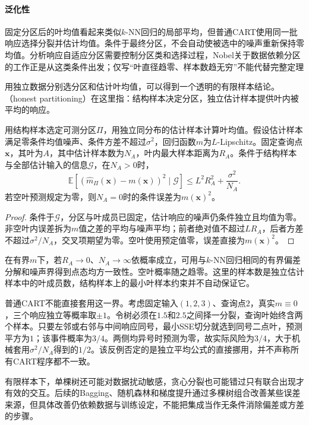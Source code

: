 \paragraph{泛化性}
固定分区后的叶均值看起来类似$k$-NN回归的局部平均，但普通CART使用同一批响应选择分裂并估计均值。条件于最终分区，不会自动使被选中的噪声重新保持零均值。分析响应自适应分区需要控制分区类和选择过程，Nobel关于数据依赖分区的工作正是从这类条件出发；仅写“叶直径趋零、样本数趋无穷”不能代替完整定理

用独立数据分别选分区和估计叶均值，可以得到一个透明的有限样本结论。（honest partitioning）在这里指：结构样本决定分区，独立估计样本提供叶内被平均的响应。

\begin{theorem}[独立分区下的叶平均误差]
  \label{thm:regression-honest-tree}
  用结构样本选定可测分区$\Pi$，用独立同分布的估计样本计算叶均值。假设估计样本满足零条件均值噪声、条件方差不超过$\sigma^2$，回归函数$m$为$L$-Lipschitz。固定查询点$\bm{x}$，其叶为$A$，其中估计样本数为$N_A$，叶内最大样本距离为$R_A$。条件于结构样本与全部估计输入的信息$\mathcal G$，在$N_A>0$时，
  \[
    \mathbb{E}[(\widehat m_\Pi(\bm{x})-m(\bm{x}))^2\mid\mathcal G]
    \leq L^2R_A^2+\frac{\sigma^2}{N_A}.
  \]
  若空叶预测规定为零，则$N_A=0$时的条件误差为$m(\bm{x})^2$。
\end{theorem}

\begin{proof}
条件于$\mathcal G$，分区与叶成员已固定，估计响应的噪声仍条件独立且均值为零。非空叶内误差拆为$m$值之差的平均与噪声平均；前者绝对值不超过$LR_A$，后者方差不超过$\sigma^2/N_A$，交叉项期望为零。空叶使用预定值零，误差直接为$m(\bm{x})^2$。
\end{proof}

在有界$m$下，若$R_A\to0$、$N_A\to\infty$依概率成立，可用与$k$-NN回归相同的有界偏差分解和噪声界得到点态均方一致性。空叶概率随之趋零。这里的样本数是独立估计样本中的叶成员数，结构样本上的最小叶样本约束并不自动保证它。

普通CART不能直接套用这一界。考虑固定输入$(1,2,3)$、查询点$2$，真实$m\equiv0$，三个响应独立等概率取$\pm1$。令树必须在$1.5$和$2.5$之间择一分裂，查询叶始终含两个样本。只要左邻或右邻与中间响应同号，最小SSE切分就选到同号二点叶，预测平方为$1$；该事件概率为$3/4$。两侧均异号时预测为零，故实际风险为$3/4$，大于机械套用$\sigma^2/N_A$得到的$1/2$。该反例否定的是独立平均公式的直接挪用，并不声称所有CART程序都不一致。

有限样本下，单棵树还可能对数据扰动敏感，贪心分裂也可能错过只有联合出现才有效的交互。后续的Bagging、随机森林和梯度提升通过多棵树组合改善某些误差来源，但具体改善仍依赖数据与训练设定，不能把集成当作无条件消除偏差或方差的步骤。

